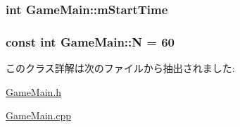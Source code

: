 \hypertarget{class_game_main_a7e8d331a37fb0910a8369e0f971eac72}{
\subsubsection[{m\+Start\+Time}]{\setlength{\rightskip}{0pt plus 5cm}int Game\+Main\+::m\+Start\+Time}}\label{class_game_main_a7e8d331a37fb0910a8369e0f971eac72}
\hypertarget{class_game_main_af369063b5921fa53f89d3c34ca8ab8c3}{
\subsubsection[{N}]{\setlength{\rightskip}{0pt plus 5cm}const int Game\+Main\+::\+N = 60\hspace{0.3cm}{\ttfamily [static]}}}\label{class_game_main_af369063b5921fa53f89d3c34ca8ab8c3}


このクラス詳解は次のファイルから抽出されました\+:\begin{DoxyCompactItemize}
\item 
\hyperlink{_game_main_8h}{Game\+Main.\+h}\item 
\hyperlink{_game_main_8cpp}{Game\+Main.\+cpp}\end{DoxyCompactItemize}
